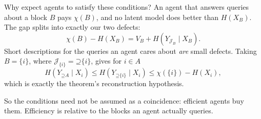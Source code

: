 \documentclass[aspectratio=169,12pt]{beamer}
\newcommand{\Up}{\mathord{\supseteq}}
\begin{document}
\begin{frame}{Why expect agents to satisfy these conditions?}
An agent that answers queries about a block $B$ pays $\chi(B)$, and no
latent model does better than $H(X_B)$. The gap splits into exactly our two
defects:
\[
\chi(B)-H(X_B)=V_B+H(Y_{\mathcal J_B}\mid X_B).
\]
Short descriptions for the queries an agent cares about \emph{are} small
defects. Taking $B=\{i\}$, where $\mathcal J_{\{i\}}=\Up\{i\}$, gives for
$i\in A$
\[
H(Y_{\Up A}\mid X_i)\le H(Y_{\Up\{i\}}\mid X_i)\le\chi(\{i\})-H(X_i),
\]
which is exactly the theorem's reconstruction hypothesis.
\medskip

So the conditions need not be assumed as a coincidence: efficient agents buy
them. Efficiency is relative to the blocks an agent actually queries.
\end{frame}
\end{document}
